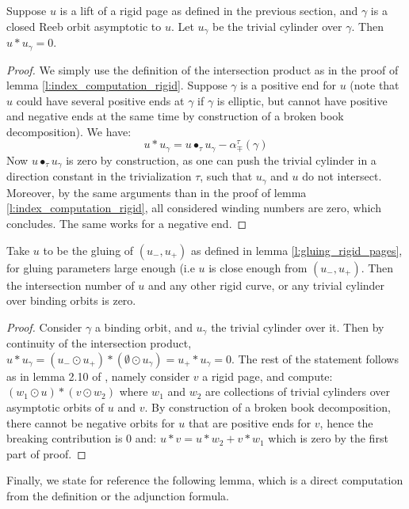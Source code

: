 \documentclass[../main.tex]{subfiles}
\begin{document}
\begin{lemma}\label{l:intersection_trivial_rigid}
Suppose $u$ is a lift of a rigid page as defined in the previous section, and $\gamma$ is a closed Reeb orbit asymptotic to $u$. Let $u_\gamma$ be the trivial cylinder over $\gamma$. Then $u*u_\gamma = 0$.
\end{lemma}
\begin{proof}
We simply use the definition of the intersection product as in the proof of lemma \ref{l:index_computation_rigid}. Suppose $\gamma$ is a positive end for $u$ (note that $u$ could have several positive ends at $\gamma$ if $\gamma$ is elliptic, but cannot have positive and negative ends at the same time by construction of a broken book decomposition). We have: $$u*u_\gamma = u\bullet_\tau u_\gamma - \alpha_\mp^\tau(\gamma)$$
Now $u\bullet _\tau u_\gamma$ is zero by construction, as one can push the trivial cylinder in a direction constant in the trivialization $\tau$, such that $u_\gamma$ and $u$ do not intersect. Moreover, by the same arguments than in the proof of lemma \ref{l:index_computation_rigid}, all considered winding numbers are zero, which concludes. The same works for a negative end.
\end{proof}
\begin{lemma}\label{l:intersection_gluing_others}
Take $u$ to be the gluing of $(u_-,u_+)$ as defined in lemma \ref{l:gluing_rigid_pages}, for gluing parameters large enough (i.e $u$ is close enough from $(u_-,u_+)$. Then the intersection number of $u$ and any other rigid curve, or any trivial cylinder over binding orbits is zero.
\end{lemma}
\begin{proof}
Consider $\gamma$ a binding orbit, and $u_\gamma$ the trivial cylinder over it. Then by continuity of the intersection product, $u*u_\gamma = (u_-\odot u_+) *(\emptyset\odot u_\gamma) = u_+*u_\gamma = 0$. The rest of the statement follows as in lemma 2.10 of \cite{SOBD2}, namely consider $v$ a rigid page, and compute: $(w_1\odot u)*(v\odot w_2)$ where $w_1$ and $w_2$ are collections of trivial cylinders over asymptotic orbits of $u$ and $v$. By construction of a broken book decomposition, there cannot be negative orbits for $u$ that are positive ends for $v$, hence the breaking contribution is $0$ and: $u*v = u*w_2 + v*w_1$ which is zero by the first part of proof.
\end{proof}

Finally, we state for reference the following lemma, which is a direct computation from the definition or the adjunction formula.
\end{document}
